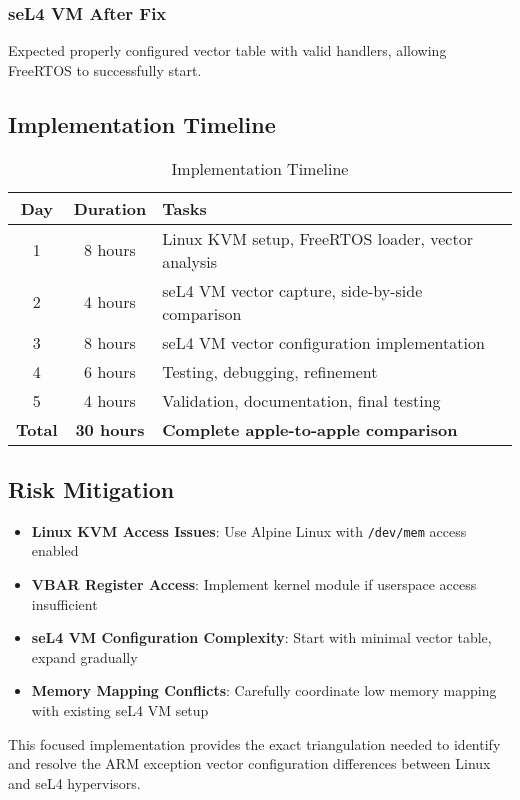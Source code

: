\documentclass[11pt,a4paper]{article}
\begin{document}
\subsubsection{seL4 VM After Fix}
Expected properly configured vector table with valid handlers, allowing FreeRTOS to successfully start.

\subsection{Implementation Timeline}

\begin{table}[h]
\centering
\begin{tabular}{|c|c|l|}
\hline
\textbf{Day} & \textbf{Duration} & \textbf{Tasks} \\
\hline
1 & 8 hours & Linux KVM setup, FreeRTOS loader, vector analysis \\
2 & 4 hours & seL4 VM vector capture, side-by-side comparison \\
3 & 8 hours & seL4 VM vector configuration implementation \\
4 & 6 hours & Testing, debugging, refinement \\
5 & 4 hours & Validation, documentation, final testing \\
\hline
\textbf{Total} & \textbf{30 hours} & \textbf{Complete apple-to-apple comparison} \\
\hline
\end{tabular}
\caption{Implementation Timeline}
\end{table}

\subsection{Risk Mitigation}

\begin{itemize}
    \item \textbf{Linux KVM Access Issues}: Use Alpine Linux with \texttt{/dev/mem} access enabled
    \item \textbf{VBAR Register Access}: Implement kernel module if userspace access insufficient  
    \item \textbf{seL4 VM Configuration Complexity}: Start with minimal vector table, expand gradually
    \item \textbf{Memory Mapping Conflicts}: Carefully coordinate low memory mapping with existing seL4 VM setup
\end{itemize}

This focused implementation provides the exact triangulation needed to identify and resolve the ARM exception vector configuration differences between Linux and seL4 hypervisors.
\end{document}
